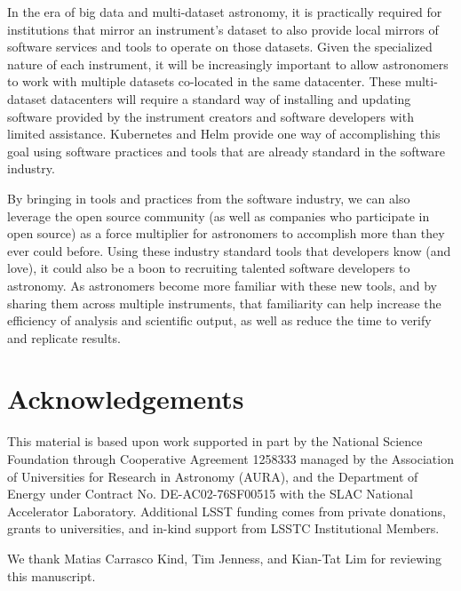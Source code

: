\documentclass[11pt,twoside]{article}
\begin{document}
In the era of big data and multi-dataset astronomy, it is practically required
for institutions that mirror an instrument's dataset to also provide local mirrors
of software services and tools to operate on those datasets.  Given the specialized
nature of each instrument, it will be increasingly important
to allow astronomers to work with multiple datasets co-located in the same datacenter.
These multi-dataset datacenters will require a standard
way of installing and updating software provided by the instrument creators and software
developers with limited assistance. Kubernetes and Helm provide one way of accomplishing
this goal using software practices and tools that are already standard in the software
industry.

By bringing in tools and practices from the software industry, we can also
leverage the open source community (as well as companies who participate in
open source) as a force multiplier for astronomers to accomplish
more than they ever could before. Using these industry standard tools that
developers know (and love), it could also be a boon to recruiting talented
software developers to astronomy.  As astronomers become more familiar with
these new tools, and by sharing them across multiple instruments, that
familiarity can help increase the efficiency of analysis and scientific
output, as well as reduce the time to verify and replicate results.

\section{Acknowledgements}

This material is based upon work supported in part by the National Science
Foundation through Cooperative Agreement 1258333 managed by the Association
of Universities for Research in Astronomy (AURA), and the Department of Energy
under Contract No. DE-AC02-76SF00515 with the SLAC National Accelerator Laboratory.
Additional LSST funding comes from private donations, grants to universities, and
in-kind support from LSSTC Institutional Members.

We thank Matias Carrasco Kind, Tim Jenness, and Kian-Tat Lim for reviewing
this manuscript.



\end{document}
